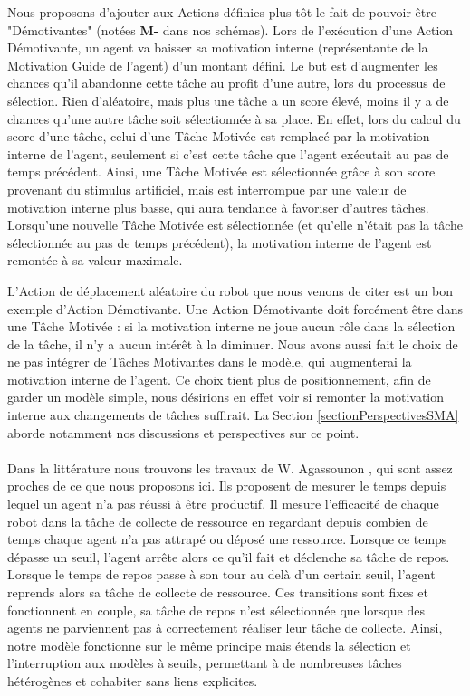 			Nous proposons d'ajouter aux Actions définies plus tôt le fait de pouvoir être "Démotivantes" (notées \textbf{M-} dans nos schémas). Lors de l'exécution d'une Action Démotivante, un agent va baisser sa motivation interne (représentante de la Motivation Guide de l'agent) d'un montant défini. Le but est d'augmenter les chances qu'il abandonne cette tâche au profit d'une autre, lors du processus de sélection. Rien d'aléatoire, mais plus une tâche a un score élevé, moins il y a de chances qu'une autre tâche soit sélectionnée à sa place. En effet, lors du calcul du score d'une tâche, celui d'une Tâche Motivée est remplacé par la motivation interne de l'agent, seulement si c'est cette tâche que l'agent exécutait au pas de temps précédent. Ainsi, une Tâche Motivée est sélectionnée grâce à son score provenant du stimulus artificiel, mais est interrompue par une valeur de motivation interne plus basse, qui aura tendance à favoriser d'autres tâches. Lorsqu'une nouvelle Tâche Motivée est sélectionnée (et qu'elle n'était pas la tâche sélectionnée au pas de temps précédent), la motivation interne de l'agent est remontée à sa valeur maximale.
			
			L'Action de déplacement aléatoire du robot que nous venons de citer est un bon exemple d'Action Démotivante. Une Action Démotivante doit forcément être dans une Tâche Motivée : si la motivation interne ne joue aucun rôle dans la sélection de la tâche, il n'y a aucun intérêt à la diminuer. Nous avons aussi fait le choix de ne pas intégrer de Tâches Motivantes dans le modèle, qui augmenterai la motivation interne de l'agent. Ce choix tient plus de positionnement, afin de garder un modèle simple, nous désirions en effet voir si remonter la motivation interne aux changements de tâches suffirait. La Section \ref{sectionPerspectivesSMA} aborde notamment nos discussions et perspectives sur ce point.
			
			
			\paragraph{}			
			Dans la littérature nous trouvons les travaux de W. Agassounon  \cite{agassounon_scalable_2001}, qui sont assez proches de ce que nous proposons ici. Ils proposent de mesurer le temps depuis lequel un agent n'a pas réussi à être productif. Il mesure l'efficacité de chaque robot dans la tâche de collecte de ressource en regardant depuis combien de temps chaque agent n'a pas attrapé ou déposé une ressource. Lorsque ce temps dépasse un seuil, l'agent arrête alors ce qu'il fait et déclenche sa tâche de repos. Lorsque le temps de repos passe à son tour au delà d'un certain seuil, l'agent reprends alors sa tâche de collecte de ressource. Ces transitions sont fixes et fonctionnent en couple, sa tâche de repos n'est sélectionnée que lorsque des agents ne parviennent pas à correctement réaliser leur tâche de collecte. Ainsi, notre modèle fonctionne sur le même principe mais étends la sélection et l'interruption aux modèles à seuils, permettant à de nombreuses tâches hétérogènes et cohabiter sans liens explicites.
			
